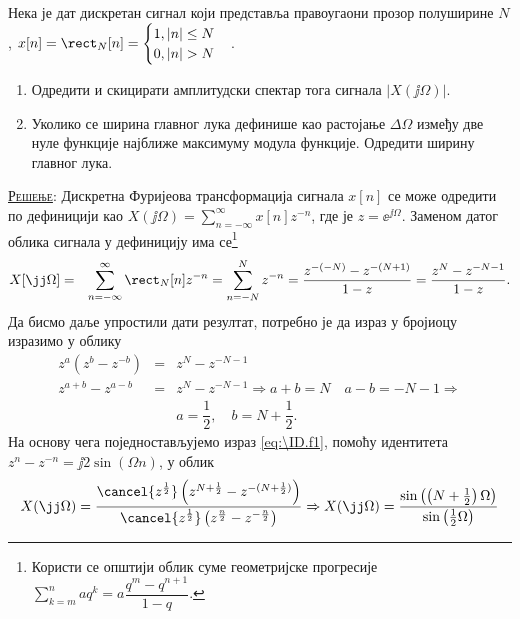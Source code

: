 \PID \label{z:dtft_rec}
Нека је дат дискретан сигнал који представља правоугаони прозор полуширине $N$,  
$x[n] = \rect_N[n] = \begin{cases}
    1, |n| \leq N \\
    0, |n| > N
\end{cases}$. 
\begin{enumerate}[label=(\alph*)]
    \item Одредити и скицирати амплитудски спектар тога сигнала $|X(\jj\Omega)|$.
    \item Уколико се ширина главног лука дефинише као растојање $\Delta \Omega$ између две нуле функције најближе 
    максимуму модула функције. Одредити ширину главног лука. 
\end{enumerate}

\textsc{\underline{Решење}:}
Дискретна Фуријеова трансформација сигнала $x[n]$ се може одредити по дефиницији као 
$X(\jj\Omega) = \sum_{n = -\infty}^{\infty} x[n] z^{-n}$, где је $z = \ee^{\jj\Omega}$. Заменом датог облика сигнала 
у дефиницију има се\footnote{Користи се општији облик суме геометријске прогресије
    $\sum_{k = m}^n a q^k = a\dfrac{q^m - q^{n+1}}{1-q}$.
}
\begin{eqnarray}
    X[\jj\Omega] &=& \sum_{n = -\infty}^{\infty} \rect_N[n] z^{-n} = \sum_{n = -N}^N z^{-n} 
    = \dfrac{ z^{-(-N)} - z^{-(N+1)} }{1 - z} = 
    \dfrac{z^{N} - z^{-N-1}}{1 - z}. \label{eq:\ID.f1}
\end{eqnarray}
Да бисмо даље упростили дати резултат, потребно је да израз у бројиоцу изразимо у облику
\begin{eqnarray}
    z^a(z^b - z^{-b}) &=& z^{N} - z^{-N-1}  \\[2mm]
    z^{a+b} - z^{a-b} &=& z^{N} - z^{-N-1} \Rightarrow
    a+b = N\quad a-b = -N-1  
    \Rightarrow \\
    && a = \dfrac{1}{2}, \quad b = N + \dfrac{1}{2}.
\end{eqnarray}
На основу чега поједностављујемо израз \ref{eq:\ID.f1}, помоћу идентитета 
$z^n - z^{-n} = \jj 2 \sin(\Omega n)$, у облик 
\begin{equation}
    X(\jj\Omega) = \dfrac{ \cancel{z^{\frac12}}\left( z^{N + \frac12} - z^{-(N + \frac12)} \right)  }
    { \cancel{z^{\frac12}} \left( z^{\frac n2} - z^{-\frac n2} \right)}
    \Rightarrow
    X(\jj\Omega) 
    = \dfrac{\sin \left( \left(N + \frac12\right) \Omega \right) }{ \sin \left(  \frac12 \Omega \right)}
    \label{\ID:eq_rez}
\end{equation}

